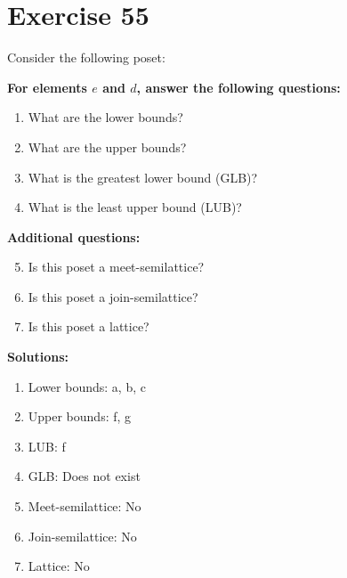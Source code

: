 \documentclass{article}
\begin{document}
\section*{Exercise 55}
Consider the following poset:
\begin{center}
\end{center}

    \textbf{For elements $e$ and $d$, answer the following questions:}
\begin{enumerate}
    \item What are the lower bounds?
    \item What are the upper bounds?
    \item What is the greatest lower bound (GLB)?
    \item What is the least upper bound (LUB)?
\end{enumerate}
    \hspace*{3ex} \textbf{Additional questions:}
\begin{enumerate}
    \setcounter{enumi}{4}
    \item Is this poset a meet-semilattice?
    \item Is this poset a join-semilattice?
    \item Is this poset a lattice?
\end{enumerate}

\textbf{Solutions:}
\begin{enumerate}
    \item Lower bounds: {a, b, c}
    \item Upper bounds: {f, g}
    \item LUB: f
    \item GLB: Does not exist
    \item Meet-semilattice: No
    \item Join-semilattice: No
    \item Lattice: No
\end{enumerate}
\newpage
\end{document}
